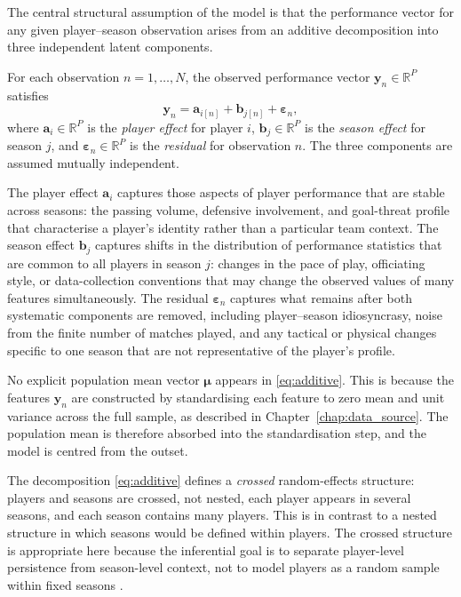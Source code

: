 The central structural assumption of the model is that the performance vector for any given player--season observation arises from an additive decomposition into three independent latent components.

\begin{definition}
\label{def:additive}
For each observation $n = 1, \ldots, N$, the observed performance vector $\mathbf{y}_n \in \mathbb{R}^P$ satisfies
\begin{equation}
\mathbf{y}_n = \mathbf{a}_{i[n]} + \mathbf{b}_{j[n]} + \boldsymbol{\varepsilon}_n,
\label{eq:additive}
\end{equation}
where $\mathbf{a}_i \in \mathbb{R}^P$ is the \emph{player effect} for player $i$, $\mathbf{b}_j \in \mathbb{R}^P$ is the \emph{season effect} for season $j$, and $\boldsymbol{\varepsilon}_n \in \mathbb{R}^P$ is the \emph{residual} for observation $n$. The three components are assumed mutually independent.
\end{definition}

The player effect $\mathbf{a}_i$ captures those aspects of player performance that are stable across seasons: the passing volume, defensive involvement, and goal-threat profile that characterise a player's identity rather than a particular team context. The season effect $\mathbf{b}_j$ captures shifts in the distribution of performance statistics that are common to all players in season $j$: changes in the pace of play, officiating style, or data-collection conventions that may change the observed values of many features simultaneously. The residual $\boldsymbol{\varepsilon}_n$ captures what remains after both systematic components are removed, including player--season idiosyncrasy, noise from the finite number of matches played, and any tactical or physical changes specific to one season that are not representative of the player's profile.

\begin{remark}
No explicit population mean vector $\boldsymbol{\mu}$ appears in \eqref{eq:additive}. This is because the features $\mathbf{y}_n$ are constructed by standardising each feature to zero mean and unit variance across the full sample, as described in Chapter~\ref{chap:data_source}. The population mean is therefore absorbed into the standardisation step, and the model is centred from the outset.
\end{remark}

The decomposition \eqref{eq:additive} defines a \emph{crossed} random-effects structure: players and seasons are crossed, not nested, each player appears in several seasons, and each season contains many players. This is in contrast to a nested structure in which seasons would be defined within players. The crossed structure is appropriate here because the inferential goal is to separate player-level persistence from season-level context, not to model players as a random sample within fixed seasons \cite{gelman2007data}.

